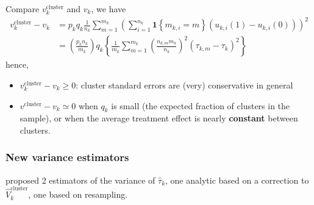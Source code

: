 \documentclass[twoside]{article}
\begin{document}
Compare $v^{\text{cluster}}_k$ and $v_k$, we have 
\begin{align*}
    v_k^{\text{cluster}} - v_k &= p_kq_k \frac{1}{n_k} \sum^{m_k}_{m=1}\left(\sum^{n_k}_{i=1} \mathbf{1}\left\{m_{k,i}=m\right\} \left(u_{k,i}(1)-u_{k,i}(0)\right) \right)^2\\
    &= \left(\frac{p_kn_k}{m_k}\right) q_k \left\{ \frac{1}{m_k} \sum^{m_k}_{m=1} \left(\frac{n_{k,m}m_k}{n_k}\right)^2 \left(\tau_{k,m}-\tau_k\right)^2 \right\}
\end{align*}
hence, 
\begin{itemize}
    \item $v^{\text{cluster}}_k-v_k\geq 0$: cluster standard errors are (very) conservative in general
    \item $v^{\text{cluster}}-v_k\simeq 0$ when $q_k$ is small (the expected fraction of clusters in the sample), or when the average treatment effect is nearly \textbf{constant} between clusters.
\end{itemize}

\subsubsection{New variance estimators}
\citet{abadie2023should} proposed 2 estimators of the variance of $\hat{\tau}_k$, one analytic based on a correction to $\hat{V}^{\text{cluster}}_k$, one based on resampling.
\end{document}
